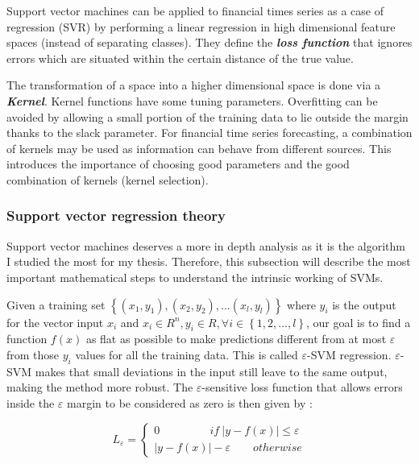 \documentclass[11pt,a4paper,oneside]{book}
\begin{document}
Support vector machines can be applied to financial times series as a case of regression (SVR) by performing a linear regression in high dimensional feature spaces (instead of separating classes). They define the \textit{\textbf{loss function}} that ignores errors which are situated within the certain distance of the true value.

The transformation of a space into a higher dimensional space is done via a \textit{\textbf{Kernel}}. Kernel functions have some tuning parameters. Overfitting can be avoided by allowing a small portion of the training data to lie outside the margin thanks to the slack parameter. For financial time series forecasting, a combination of kernels may be used as information can behave from different sources. This introduces the importance of choosing good parameters and the good combination of kernels (kernel selection). \cite{kim}\cite{liwang}\cite{Smola}


\subsubsection{Support vector regression theory}

Support vector machines deserves a more in depth analysis as it is the algorithm I studied the most for my thesis. Therefore, this subsection will describe the most important mathematical steps to understand the intrinsic working of SVMs.

Given a training set $\left \{ \left ( x_{1}, y_{1} \right ), \left ( x_{2}, y_{2} \right ), ... \left ( x_{l}, y_{l} \right ) \right \}$ where $y_{i}$ is the output for the vector input $x_{i}$ and $x_{i} \in R^{n} , y_{i} \in R,  \forall i \in \left \{ 1,2, ...,l \right \}$, our goal is to find a function $f\left ( x \right )$ as flat as possible to make predictions different from at most $\varepsilon$ from those $y_{i}$ values for all the training data. This is called $\varepsilon$-SVM regression. $\varepsilon$-SVM makes that small deviations in the input still leave to the same output, making the method more robust. The $\varepsilon$-sensitive loss function that allows errors inside the $\varepsilon$ margin to be considered as zero is then given by :

\begin{equation}
L_{\varepsilon} = \left\{\begin{matrix}
0 \qquad\qquad\ \   if \ \left | y - f\left ( x \right )\right | \leq \varepsilon \\ 
\left | y - f\left ( x \right )\right | - \varepsilon \qquad otherwise
\end{matrix}\right.
\end{equation} \cite{Cortes}\cite{Smola} 
\end{document}
